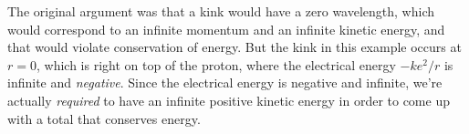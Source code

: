 The original argument was that a kink would have a zero wavelength, which would correspond
to an infinite momentum and an infinite kinetic energy, and that would violate conservation
of energy. But the kink in this example occurs at $r=0$, which is right on top of the
proton, where the electrical energy $-ke^2/r$ is infinite and \emph{negative}. Since
the electrical energy is negative and infinite, we're actually \emph{required} to have
an infinite positive kinetic energy in order to come up with a total that conserves
energy.
